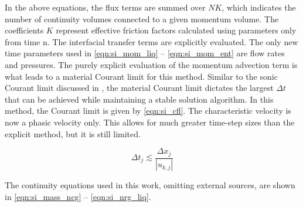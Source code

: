 In the above equations, the flux terms are summed over $NK$, which indicates the number of continuity volumes connected to a given momentum volume.
The coefficients $K$ represent effective friction factors calculated using parameters only from time n.
The interfacial transfer terms are explicitly evaluated.
The only new time parameters used in \eqref{eqn:si_mom_liq} -- \eqref{eqn:si_mom_ent} are flow rates and pressures.
The purely explicit evaluation of the momentum advection term is what leads to a material Courant limit for this method.
Similar to the sonic Courant limit discussed in , the material Courant limit dictates the largest $\Delta t$ that can be achieved while maintaining a stable solution algorithm.
In this method, the Courant limit is given by \eqref{eqn:si_cfl}.
The characteristic velocity is now a phasic velocity only.
This allows for much greater time-step sizes than the explicit method, but it is still limited.

\begin{equation}
\label{eqn:si_cfl}
\Delta t_j \lesssim \frac{\Delta x_j}{|u_{k,j}|}
\end{equation}

The continuity equations used in this work, omitting external sources, are shown in \eqref{eqn:si_mass_ncg} -- \eqref{eqn:si_nrg_liq}.

